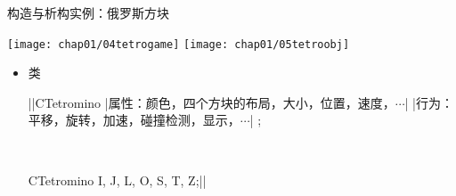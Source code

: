 \begin{frame}[t, fragile]{构造与析构}{实例：俄罗斯方块}
  \begin{center}
    \texttt{[image: chap01/04tetrogame]} \qquad%
    \texttt{[image: chap01/05tetroobj]} %
  \end{center}
  \begin{itemize}
  \item 类\\
    \begin{center}
      \qquad
      \begin{minipage}{0.65\linewidth}
        \begin{cpptt}
||CTetromino
{
  |属性：颜色，四个方块的布局，大小，位置，速度，$\cdots$|
  |行为：平移，旋转，加速，碰撞检测，显示，$\cdots$|
};
        \end{cpptt}
      \end{minipage}\\
      \begin{minipage}{0.42\linewidth}
        \begin{cpptt}
CTetromino I, J, L, O, S, T, Z;||
        \end{cpptt}
      \end{minipage}\qquad
    \end{center}
  \end{itemize}
\end{frame}

